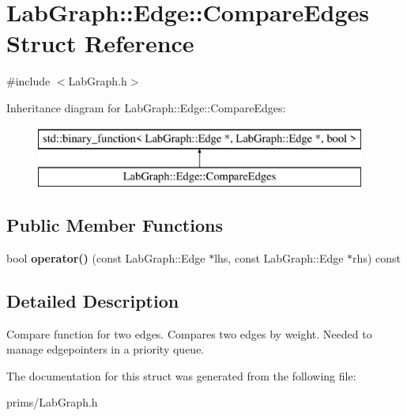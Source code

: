 \hypertarget{struct_lab_graph_1_1_edge_1_1_compare_edges}{\section{Lab\-Graph\-:\-:Edge\-:\-:Compare\-Edges Struct Reference}
\label{struct_lab_graph_1_1_edge_1_1_compare_edges}
}


{\ttfamily \#include $<$Lab\-Graph.\-h$>$}

Inheritance diagram for Lab\-Graph\-:\-:Edge\-:\-:Compare\-Edges\-:\begin{figure}[H]
\begin{center}
\leavevmode
\includegraphics[height=2.000000cm]{struct_lab_graph_1_1_edge_1_1_compare_edges}
\end{center}
\end{figure}
\subsection*{Public Member Functions}
\begin{DoxyCompactItemize}
\item 
\hypertarget{struct_lab_graph_1_1_edge_1_1_compare_edges_a90996d6326dc05c6536d8205e16ca437}{bool {\bfseries operator()} (const Lab\-Graph\-::\-Edge $\ast$lhs, const Lab\-Graph\-::\-Edge $\ast$rhs) const }\label{struct_lab_graph_1_1_edge_1_1_compare_edges_a90996d6326dc05c6536d8205e16ca437}

\end{DoxyCompactItemize}


\subsection{Detailed Description}
Compare function for two edges. Compares two edges by weight. Needed to manage edgepointers in a priority queue. 

The documentation for this struct was generated from the following file\-:\begin{DoxyCompactItemize}
\item 
prims/Lab\-Graph.\-h\end{DoxyCompactItemize}
